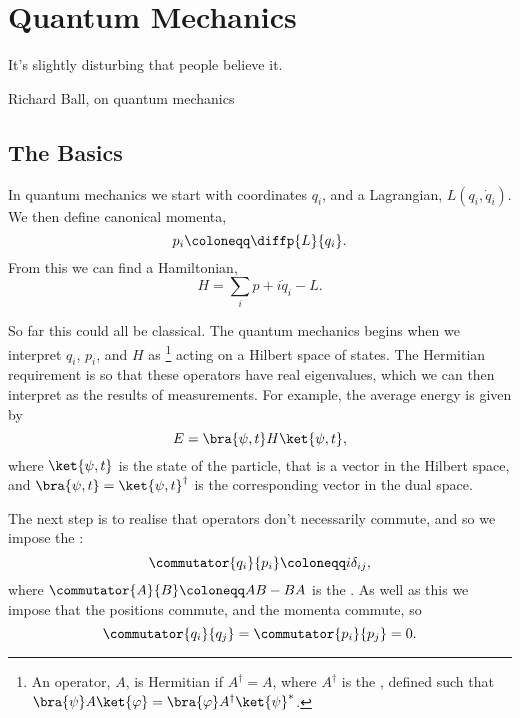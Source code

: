 \documentclass[fleqn]{NotesClass}
\newcommand{\lagrangian}{L}
\newcommand{\hermit}{{\dagger}}
\begin{document}
    \section{Quantum Mechanics}
    \epigraph{It's slightly disturbing that people believe it.}{Richard Ball, on quantum mechanics}
    \subsection{The Basics}
    In quantum mechanics we start with coordinates \(q_i\), and a Lagrangian, \(\lagrangian(q_i, \dot{q}_i)\).
    We then define canonical momenta,
    \begin{equation}
        p_i \coloneqq \diffp{\lagrangian}{q_i}.
    \end{equation}
    From this we can find a Hamiltonian,
    \begin{equation}
        H = \sum_i p+i\dot{q}_i - \lagrangian.
    \end{equation}

    So far this could all be classical.
    The quantum mechanics begins when we interpret \(q_i\), \(p_i\), and \(H\) as \footnote{An operator, \(A\), is Hermitian if \(A^\hermit = A\), where \(A^\hermit\) is the , defined such that \(\bra{\psi}A\ket{\varphi} = \bra{\varphi}A^\hermit\ket{\psi}^*\).} acting on a Hilbert space of states.
    The Hermitian requirement is so that these operators have real eigenvalues, which we can then interpret as the results of measurements.
    For example, the average energy is given by
    \begin{equation}
        E = \bra{\psi, t} H \ket{\psi, t},
    \end{equation}
    where \(\ket{\psi, t}\) is the state of the particle, that is a vector in the Hilbert space, and \(\bra{\psi, t} = \ket{\psi, t}^\hermit\) is the corresponding vector in the dual space.
    
    The next step is to realise that operators don't necessarily commute, and so we impose the :
    \begin{equation}
        \commutator{q_i}{p_i} \coloneqq i\delta_{ij},
    \end{equation}
    where \(\commutator{A}{B} \coloneqq AB - BA\) is the .
    As well as this we impose that the positions commute, and the momenta commute, so
    \begin{equation}
        \commutator{q_i}{q_j} = \commutator{p_i}{p_j} = 0.
    \end{equation}
    
\end{document}
